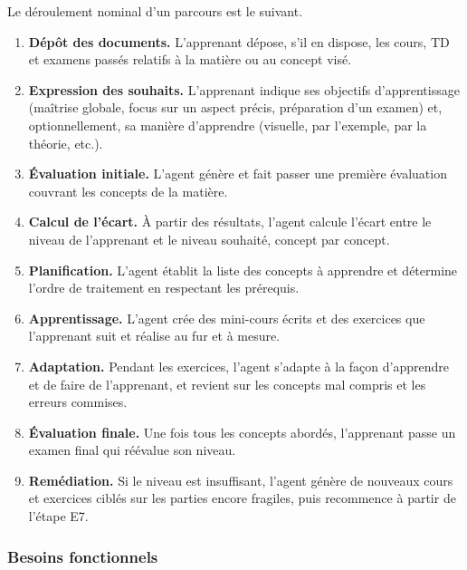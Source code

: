 \documentclass[11pt,a4paper]{article}
\begin{document}
Le déroulement nominal d'un parcours est le suivant.

\begin{enumerate}[label=\textbf{E\arabic*.}]
  \item \textbf{Dépôt des documents.} L'apprenant dépose, s'il en dispose, les cours, TD et examens passés relatifs à la matière ou au concept visé.
  \item \textbf{Expression des souhaits.} L'apprenant indique ses objectifs d'apprentissage (maîtrise globale, focus sur un aspect précis, préparation d'un examen) et, optionnellement, sa manière d'apprendre (visuelle, par l'exemple, par la théorie, etc.).
  \item \textbf{Évaluation initiale.} L'agent génère et fait passer une première évaluation couvrant les concepts de la matière.
  \item \textbf{Calcul de l'écart.} À partir des résultats, l'agent calcule l'écart entre le niveau de l'apprenant et le niveau souhaité, concept par concept.
  \item \textbf{Planification.} L'agent établit la liste des concepts à apprendre et détermine l'ordre de traitement en respectant les prérequis.
  \item \textbf{Apprentissage.} L'agent crée des mini-cours écrits et des exercices que l'apprenant suit et réalise au fur et à mesure.
  \item \textbf{Adaptation.} Pendant les exercices, l'agent s'adapte à la façon d'apprendre et de faire de l'apprenant, et revient sur les concepts mal compris et les erreurs commises.
  \item \textbf{Évaluation finale.} Une fois tous les concepts abordés, l'apprenant passe un examen final qui réévalue son niveau.
  \item \textbf{Remédiation.} Si le niveau est insuffisant, l'agent génère de nouveaux cours et exercices ciblés sur les parties encore fragiles, puis recommence à partir de l'étape E7.
\end{enumerate}

\subsubsection{Besoins fonctionnels}
\end{document}
